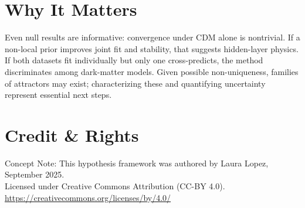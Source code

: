 \documentclass[11pt]{article}
\begin{document}
\section{Why It Matters}
Even null results are informative: convergence under CDM alone is nontrivial.
If a non-local prior improves joint fit and stability, that suggests hidden-layer physics.
If both datasets fit individually but only one cross-predicts, the method
discriminates among dark-matter models.
Given possible non-uniqueness, families of attractors may exist; characterizing these
and quantifying uncertainty represent essential next steps.

\section*{Credit \& Rights}
Concept Note: This hypothesis framework was authored by Laura Lopez, September 2025.\\
Licensed under Creative Commons Attribution (CC-BY 4.0).\\
\url{https://creativecommons.org/licenses/by/4.0/}
\end{document}
